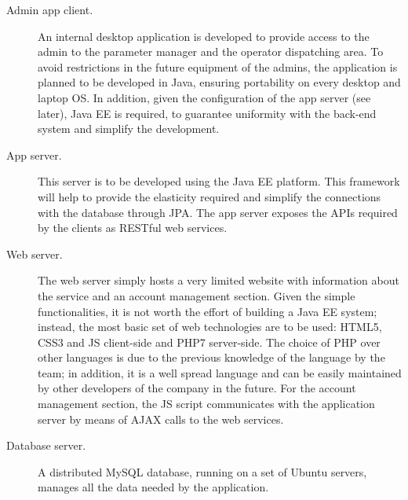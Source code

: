 \begin{description}
		\item[Admin app client.] An internal desktop application is developed to provide access to the admin to the parameter manager and the operator dispatching area. To avoid restrictions in the future equipment of the admins, the application is planned to be developed in Java, ensuring portability on every desktop and laptop OS. In addition, given the configuration of the app server (see later), Java EE is required, to guarantee uniformity with the back-end system and simplify the development.

		\item[App server.] This server is to be developed using the Java EE platform. This framework will help to provide the elasticity required and simplify the connections with the database through JPA. The app server exposes the APIs required by the clients as RESTful web services.

		\item[Web server.] The web server simply hosts a very limited website with information about the service and an account management section. Given the simple functionalities, it is not worth the effort of building a Java EE system; instead, the most basic set of web technologies are to be used: HTML5, CSS3 and JS client-side and PHP7 server-side. The choice of PHP over other languages is due to the previous knowledge of the language by the team; in addition, it is a well spread language and can be easily maintained by other developers of the company in the future. For the account management section, the JS script communicates with the application server by means of AJAX calls to the web services.

		\item[Database server.] A distributed MySQL database, running on a set of Ubuntu servers, manages all the data needed by the application.
	\end{description}

